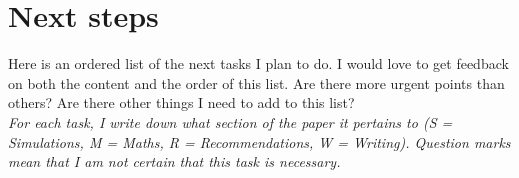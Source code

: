 \documentclass[usletter, 12pt]{article}
\begin{document}
	



\section{Next steps} \label{next_steps}

	Here is an ordered list of the next tasks I plan to do. I would love to get feedback on both the content and the order of this list. Are there more urgent points than others? Are there other things I need to add to this list?\\

	\textit{For each task, I write down what section of the paper it pertains to (S = Simulations, M = Maths, R = Recommendations, W = Writing). Question marks mean that I am not certain that this task is necessary.}\\
\end{document}
